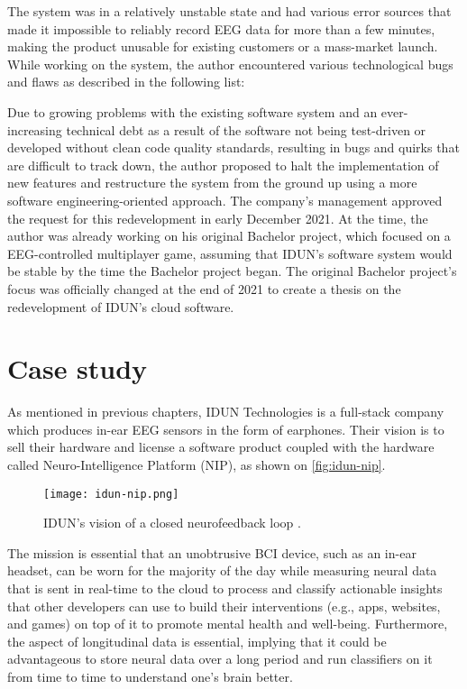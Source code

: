 The system was in a relatively unstable state and had various error sources that made it impossible to reliably record EEG data for more than a few minutes, making the product unusable for existing customers or a mass-market launch. While working on the system, the author encountered various technological bugs and flaws as described in the following list:

Due to growing problems with the existing software system and an ever-increasing technical debt as a result of the software not being test-driven or developed without clean code quality standards, resulting in bugs and quirks that are difficult to track down, the author proposed to halt the implementation of new features and restructure the system from the ground up using a more software engineering-oriented approach. The company's management approved the request for this redevelopment in early December 2021. At the time, the author was already working on his original Bachelor project, which focused on a EEG-controlled multiplayer game, assuming that IDUN's software system would be stable by the time the Bachelor project began. The original Bachelor project's focus was officially changed at the end of 2021 to create a thesis on the redevelopment of IDUN's cloud software.

\section{Case study}
\label{chapter3-case-study}

As mentioned in previous chapters, IDUN Technologies is a full-stack company which produces in-ear EEG sensors in the form of earphones. Their vision is to sell their hardware and license a software product coupled with the hardware called Neuro-Intelligence Platform (NIP), as shown on \autoref{fig:idun-nip}.

\begin{figure}[!ht]
  \centering
  \texttt{[image: idun-nip.png]}
  \caption[IDUN's vision of a closed neurofeedback loop ]{IDUN's vision of a closed neurofeedback loop \citep{idun_guardian_nodate}.}
  \label{fig:idun-nip}
\end{figure}

The mission is essential that an unobtrusive BCI device, such as an in-ear headset, can be worn for the majority of the day while measuring neural data that is sent in real-time to the cloud to process and classify actionable insights that other developers can use to build their interventions (e.g., apps, websites, and games) on top of it to promote mental health and well-being. Furthermore, the aspect of longitudinal data is essential, implying that it could be advantageous to store neural data over a long period and run classifiers on it from time to time to understand one's brain better.

